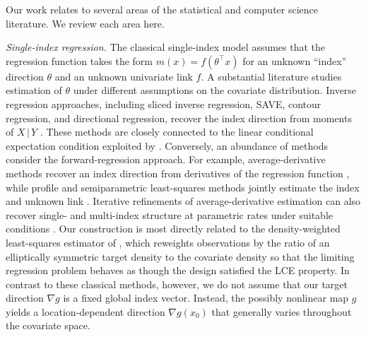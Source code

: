 \documentclass[11pt]{article}
\begin{document}
Our work relates to several areas of the statistical and computer science literature. We review each area here.
\medskip

\emph{Single-index regression.}
The classical single-index model assumes that the regression function takes the form $m(x)=f(\theta^\top x)$ for an unknown ``index'' direction $\theta$ and an unknown univariate link $f$. A substantial literature studies estimation of $\theta$ under different assumptions on the covariate distribution. Inverse regression approaches, including sliced inverse regression, SAVE, contour regression, and directional regression, recover the index direction from moments of $X \,|\, Y$ \citep{li1991sliced,dennis2000save,li2005contour,li2007directional}. These methods are closely connected to the linear conditional expectation condition exploited by \citet{li1989regression}. Conversely, an abundance of methods consider the forward-regression approach. For example, average-derivative methods recover an index direction from derivatives of the regression function \citep{hardle1989average,powell1989semiparametric}, while profile and semiparametric least-squares methods jointly estimate the index and unknown link \citep{ichimura1993semiparametric,hardle1993optimal}. Iterative refinements of average-derivative estimation can also recover single- and multi-index structure at parametric rates under suitable conditions \citep{hristache2001direct,hristache2001structure}. Our construction is most directly related to the density-weighted least-squares estimator of \citet{Newey_Ruud_2005}, which reweights observations by the ratio of an elliptically symmetric target density to the covariate density so that the limiting regression problem behaves as though the design satisfied the LCE property. In contrast to these classical methods, however, we do not assume that our target direction $\nabla g$ is a fixed global index vector. Instead, the possibly nonlinear map $g$ yields a location-dependent direction $\nabla g(x_0)$ that generally varies throughout the covariate space.
\medskip 
\end{document}
